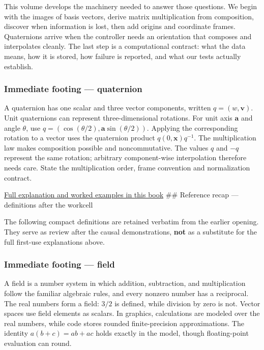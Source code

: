 This volume develops the machinery needed to answer those questions. We begin with the images of basis vectors, derive matrix multiplication from composition, discover when information is lost, then add origins and coordinate frames. Quaternions arrive when the controller needs an orientation that composes and interpolates cleanly. The last step is a computational contract: what the data means, how it is stored, how failure is reported, and what our tests actually establish.

\subsubsection{Immediate footing --- quaternion}\label{01-foundations-i-ch018-immediate-footing-quaternion}

A quaternion has one scalar and three vector components, written \(q=(w,\mathbf v)\). Unit quaternions can represent three-dimensional rotations. For unit axis \(\mathbf a\) and angle \(\theta\), use \(q=(\cos(\theta/2),\mathbf a\sin(\theta/2))\). Applying the corresponding rotation to a vector uses the quaternion product \(q(0,\mathbf x)q^{-1}\). The multiplication law makes composition possible and noncommutative. The values \(q\) and \(-q\) represent the same rotation; arbitrary component-wise interpolation therefore needs care. State the multiplication order, frame convention and normalization contract.

\hyperref[01-foundations-i-ch019-orientation-needs-a-state-that-can-be-composed]{Full explanation and worked examples in this book} \#\# Reference recap --- definitions after the workcell

The following compact definitions are retained verbatim from the earlier opening. They serve as review after the causal demonstrations, \textbf{not} as a substitute for the full first-use explanations above.

\subsubsection{Immediate footing --- field}\label{01-foundations-i-ch018-immediate-footing-field}

A field is a number system in which addition, subtraction, and multiplication follow the familiar algebraic rules, and every nonzero number has a reciprocal. The real numbers form a field: \(3/2\) is defined, while division by zero is not. Vector spaces use field elements as scalars. In graphics, calculations are modeled over the real numbers, while code stores rounded finite-precision approximations. The identity \(a(b+c)=ab+ac\) holds exactly in the model, though floating-point evaluation can round.

